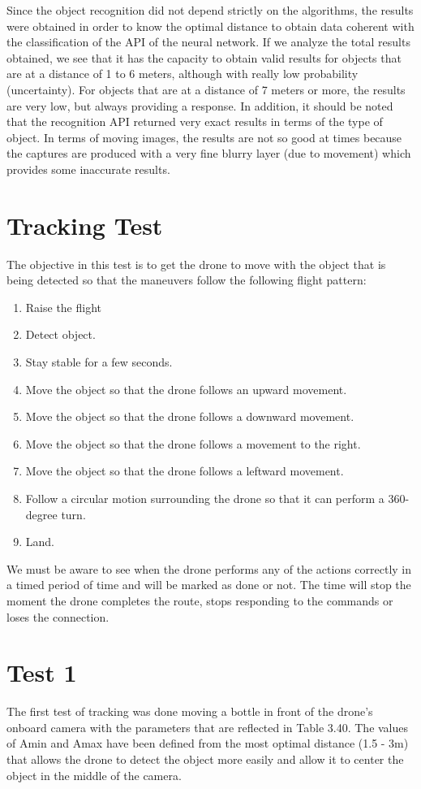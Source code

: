 Since the object recognition did not depend strictly on the algorithms, the results were obtained in order to know the optimal distance to obtain data coherent with the classification of the API of the neural network. If we analyze the total results obtained, we see that it has the capacity to obtain valid results for objects that are at a distance of 1 to 6 meters, although with really low probability (uncertainty). For objects that are at a distance of 7 meters or more, the results are very low, but always providing a response. In addition, it should be noted that the recognition API returned very exact results in terms of the type of object. In terms of moving images, the results are not so good at times because the captures are produced with a very fine blurry layer (due to movement) which provides some inaccurate results.


\section{Tracking Test}

The objective in this test is to get the drone to move with the object that is being detected so that the maneuvers follow the following flight pattern:

\begin{enumerate}
\item Raise the flight
\item Detect object.
\item Stay stable for a few seconds.
\item Move the object so that the drone follows an upward movement.
\item Move the object so that the drone follows a downward movement.
\item Move the object so that the drone follows a movement to the right.
\item Move the object so that the drone follows a leftward movement.
\item Follow a circular motion surrounding the drone so that it can perform a 360-degree turn.
\item Land.
\end{enumerate}

We must be aware to see when the drone performs any of the actions correctly in a timed period of time and will be marked as done or not. The time will stop the moment the drone completes the route, stops responding to the commands or loses the connection.

\section{Test 1}
The first test of tracking was done moving a bottle in front of the drone’s onboard camera with the parameters that are reflected in Table 3.40. The values of Amin and Amax have been defined from the most optimal distance (1.5 - 3m) that allows the drone to detect the object more easily and allow it to center the object in the middle of the camera.

